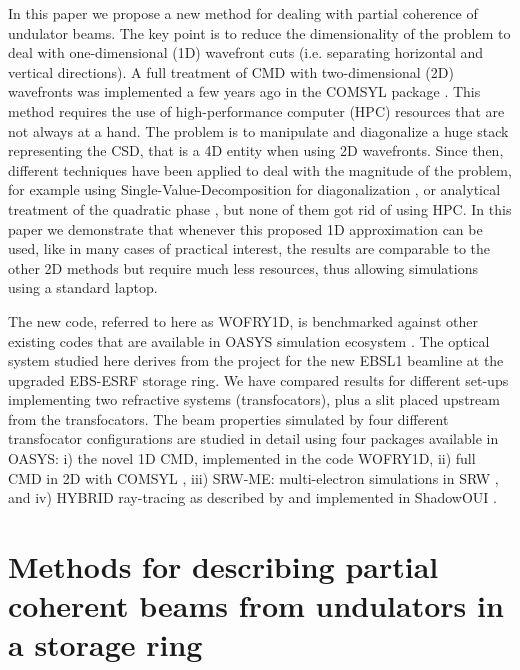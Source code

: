 \documentclass{iucr}              %
\begin{document}
In this paper we propose a new method for dealing with partial coherence of undulator beams. The key point is to reduce the dimensionality of the problem to deal with one-dimensional (1D) wavefront cuts (i.e. separating horizontal and vertical directions). A full treatment of CMD with two-dimensional (2D) wavefronts was implemented a few years ago in the COMSYL package \cite{codeCOMSYL}. This method requires the use of high-performance computer (HPC) resources that are not always at a hand. The problem is to manipulate and diagonalize a huge stack representing the CSD, that is a 4D entity when using 2D wavefronts. Since then, different techniques have been applied to deal with the magnitude of the problem, for example using Single-Value-Decomposition for diagonalization \cite{SVDHanXu}, or analytical treatment of the quadratic phase \cite{ChubarCMD2022}, but none of them got rid of using HPC. In this paper we demonstrate that whenever this proposed 1D approximation can be used, like in many cases of practical interest, the results are comparable to the other 2D methods but require much less resources, thus allowing simulations using a standard laptop. 

The new code, referred to here as WOFRY1D, is benchmarked against other existing codes that are available in OASYS simulation ecosystem \cite{codeOASYS}. The optical system studied here derives from the project for the new EBSL1 beamline at the upgraded EBS-ESRF storage ring. We have compared results for different set-ups implementing two refractive systems (transfocators), plus a slit placed upstream from the transfocators. The beam properties simulated by four different transfocator configurations are studied in detail using four packages available in OASYS: i) the novel 1D CMD, implemented in the code WOFRY1D, ii) full CMD in 2D with COMSYL \cite{codeCOMSYL}, iii) SRW-ME: multi-electron simulations in SRW \cite{codeSRW}, and iv) HYBRID ray-tracing as described by  and implemented in ShadowOUI \cite{codeSHADOWOUI}.


\section{Methods for describing partial coherent beams from undulators in a storage ring}\label{sec:part_coh}
\end{document}
